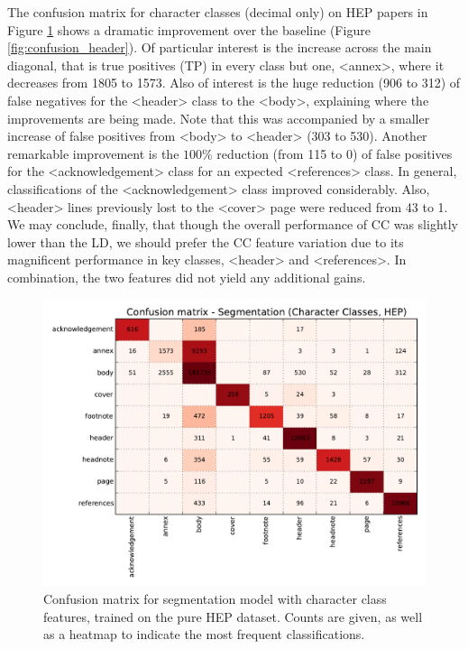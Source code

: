 The confusion matrix for character classes (decimal only) on HEP papers in Figure \ref{fig:confusion_segmentation} shows a dramatic improvement over the baseline (Figure \ref{fig:confusion_header}). Of particular interest is the increase across the main diagonal, that is true positives (TP) in every class but one, <annex>, where it decreases from 1805 to 1573. Also of interest is the huge reduction (906 to 312) of false negatives for the <header> class to the <body>, explaining where the improvements are being made. Note that this was accompanied by a smaller increase of false positives from <body> to <header> (303 to 530). Another remarkable improvement is the $100\%$ reduction (from 115 to 0) of false positives for the <acknowledgement> class for an expected <references> class. In general, classifications of the <acknowledgement> class improved considerably. Also, <header> lines previously lost to the <cover> page were reduced from 43 to 1.  We may conclude, finally, that though the overall performance of CC was slightly lower than the LD, we should prefer the CC feature variation due to its magnificent performance in key classes, <header> and <references>. In combination, the two features did not yield any additional gains.

\begin{figure}[h]
\center
\includegraphics[width=5.5in]{Figures/classes_confusion_segmentation.pdf}
\caption{Confusion matrix for segmentation model with character class features, trained on the pure HEP dataset. Counts are given, as well as a heatmap to indicate the most frequent classifications.}
\label{fig:confusion_segmentation}
\end{figure}


